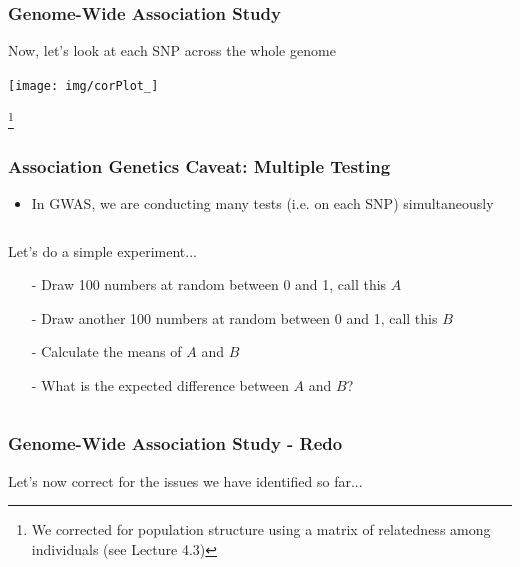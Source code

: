 \documentclass[xcolor=dvipsnames]{beamer}
\newcommand\blfootnote[1]{%
	\begingroup
	\renewcommand\thefootnote{}\footnote{#1}%
	\addtocounter{footnote}{-1}%
	\endgroup
}
\begin{document}
\begin{frame}
	\frametitle{Genome-Wide Association Study}
	Now, let's look at each SNP across the whole genome 
	
	\texttt{[image: img/corPlot\_]}				
	
	\blfootnote{We corrected for population structure using a matrix of relatedness among individuals (see Lecture 4.3)}
\end{frame}


\begin{frame}	
	\frametitle{Association Genetics Caveat: Multiple Testing}
\begin{itemize}	
\item In GWAS, we are conducting many tests (i.e. on each SNP) simultaneously
\end{itemize} \pause


\begin{columns}
	\begin{column}{0.5\textwidth}
		Let's do a simple experiment...\\
		\begin{itemize}
			\item[-] Draw 100 numbers at random between 0 and 1, call this $A$ \pause
			\item[-] Draw another 100 numbers at random between 0 and 1, call this $B$ \pause
			\item[-] Calculate the means of $A$ and $B$ \pause
			\item[-] What is the expected difference between $A$ and $B$? \pause
			\end{itemize}
		
		
	\end{column}
	\begin{column}{0.5\textwidth}
	\end{column}
\end{columns}





\end{frame}

\begin{frame}
		\frametitle{Genome-Wide Association Study - Redo}

Let's now correct for the issues we have identified so far...

\end{frame}
\end{document}

